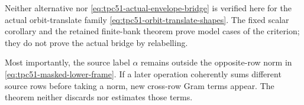 Neither alternative nor \eqref{eq:tpc51-actual-envelope-bridge} is
verified here for the actual orbit-translate family
\eqref{eq:tpc51-orbit-translate-shapes}.  The fixed scalar corollary and
the retained finite-bank theorem prove model cases of the criterion;
they do not prove the actual bridge by relabelling.

Most importantly, the source label \(\alpha\) remains outside the
opposite-row norm in \eqref{eq:tpc51-masked-lower-frame}.  If a later
operation coherently sums different source rows before taking a norm,
new cross-row Gram terms appear.  The theorem neither discards nor
estimates those terms.
